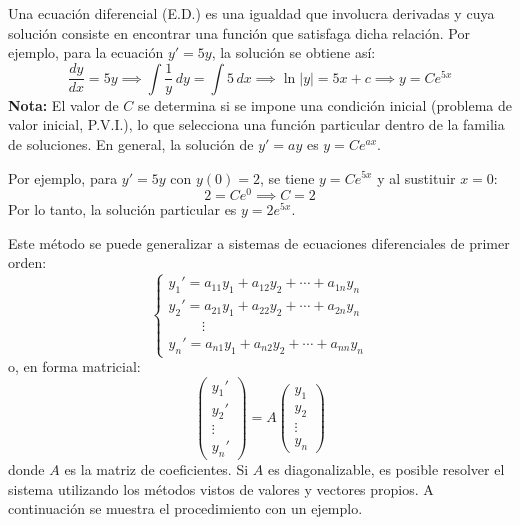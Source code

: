 \begin{rem}\label{rem:edo_primer_orden}
Una ecuación diferencial (E.D.) es una igualdad que involucra derivadas y cuya solución consiste en encontrar una función que satisfaga dicha relación. Por ejemplo, para la ecuación $y' = 5y$, la solución se obtiene así:
\[
\frac{dy}{dx} = 5y \implies \int \frac{1}{y} \, dy = \int 5 \, dx \implies \ln|y| = 5x + c \implies y = Ce^{5x}
\]
\textbf{Nota:} El valor de $C$ se determina si se impone una condición inicial (problema de valor inicial, P.V.I.), lo que selecciona una función particular dentro de la familia de soluciones. En general, la solución de $y' = ay$ es $\boxed{y = Ce^{ax}}$.

Por ejemplo, para $y' = 5y$ con $y(0) = 2$, se tiene $y = Ce^{5x}$ y al sustituir $x=0$:
\[
2 = Ce^{0} \implies C = 2
\]
Por lo tanto, la solución particular es $y = 2e^{5x}$.

Este método se puede generalizar a sistemas de ecuaciones diferenciales de primer orden:
\[
\begin{cases}
y_1' = a_{11}y_1 + a_{12}y_2 + \cdots + a_{1n}y_n \\
y_2' = a_{21}y_1 + a_{22}y_2 + \cdots + a_{2n}y_n \\
\hspace{1cm} \vdots \\
y_n' = a_{n1}y_1 + a_{n2}y_2 + \cdots + a_{nn}y_n
\end{cases}
\]
o, en forma matricial:
\[
\begin{pmatrix}
y_1' \\ y_2' \\ \vdots \\ y_n'
\end{pmatrix}
= A
\begin{pmatrix}
y_1 \\ y_2 \\ \vdots \\ y_n
\end{pmatrix}
\]
donde $A$ es la matriz de coeficientes. Si $A$ es diagonalizable, es posible resolver el sistema utilizando los métodos vistos de valores y vectores propios. A continuación se muestra el procedimiento con un ejemplo.
\end{rem}

